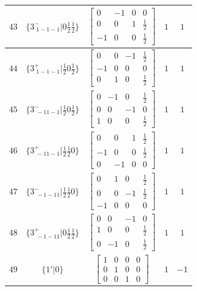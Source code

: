 \documentclass[fleqn,8pt]{jsarticle}
\begin{document}
\begin{longtable}{ccccc}
$ 43 $ & $ \{3^{-}_{\,\,1-1-1}|0 \frac{1}{2} \frac{1}{2}\} $ & $ \begin{bmatrix} 0 & -1 & 0 & 0 \\ 0 & 0 & 1 & \frac{1}{2} \\ -1 & 0 & 0 & \frac{1}{2} \end{bmatrix} $ & $ 1 $ & $ 1 $ \\ \hline
$ 44 $ & $ \{3^{+}_{\,\,1-1-1}|\frac{1}{2} 0 \frac{1}{2}\} $ & $ \begin{bmatrix} 0 & 0 & -1 & \frac{1}{2} \\ -1 & 0 & 0 & 0 \\ 0 & 1 & 0 & \frac{1}{2} \end{bmatrix} $ & $ 1 $ & $ 1 $ \\ \hline
$ 45 $ & $ \{3^{-}_{\,\,-11-1}|\frac{1}{2} 0 \frac{1}{2}\} $ & $ \begin{bmatrix} 0 & -1 & 0 & \frac{1}{2} \\ 0 & 0 & -1 & 0 \\ 1 & 0 & 0 & \frac{1}{2} \end{bmatrix} $ & $ 1 $ & $ 1 $ \\ \hline
$ 46 $ & $ \{3^{+}_{\,\,-11-1}|\frac{1}{2} \frac{1}{2} 0\} $ & $ \begin{bmatrix} 0 & 0 & 1 & \frac{1}{2} \\ -1 & 0 & 0 & \frac{1}{2} \\ 0 & -1 & 0 & 0 \end{bmatrix} $ & $ 1 $ & $ 1 $ \\ \hline
$ 47 $ & $ \{3^{-}_{\,\,-1-11}|\frac{1}{2} \frac{1}{2} 0\} $ & $ \begin{bmatrix} 0 & 1 & 0 & \frac{1}{2} \\ 0 & 0 & -1 & \frac{1}{2} \\ -1 & 0 & 0 & 0 \end{bmatrix} $ & $ 1 $ & $ 1 $ \\ \hline
$ 48 $ & $ \{3^{+}_{\,\,-1-11}|0 \frac{1}{2} \frac{1}{2}\} $ & $ \begin{bmatrix} 0 & 0 & -1 & 0 \\ 1 & 0 & 0 & \frac{1}{2} \\ 0 & -1 & 0 & \frac{1}{2} \end{bmatrix} $ & $ 1 $ & $ 1 $ \\ \hline
$ 49 $ & $ \{1{}'|0\} $ & $ \begin{bmatrix} 1 & 0 & 0 & 0 \\ 0 & 1 & 0 & 0 \\ 0 & 0 & 1 & 0 \end{bmatrix} $ & $ 1 $ & $ -1 $ \\ \hline

\end{longtable}
\end{document}
